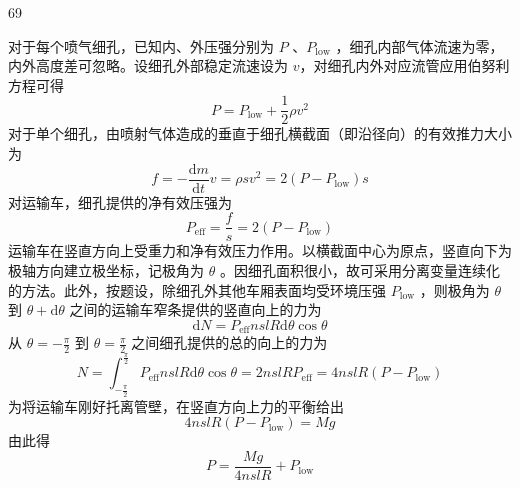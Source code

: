 \begin{solution}{69}
    \begin{subsolution}
        对于每个喷气细孔，已知内、外压强分别为 $P$ 、$P_{\mathrm{low}}$ ，细孔内部气体流速为零，内外高度差可忽略。设细孔外部稳定流速设为 $v$，对细孔内外对应流管应用伯努利方程可得
        \begin{equation}
            P = P_{\mathrm{low}} + \frac{1}{2}\rho v^{2} \label{eq:1.p69}
        \end{equation}
        对于单个细孔，由喷射气体造成的垂直于细孔横截面（即沿径向）的有效推力大小为
        \begin{equation}
            f = -\frac{\mathrm{d}m}{\mathrm{d}t} v = \rho s v^{2} = 2(P - P_{\mathrm{low}}) s \label{eq:2.p69}
        \end{equation}
        对运输车，细孔提供的净有效压强为
        \begin{equation*}
            P_{\mathrm{eff}} = \frac{f}{s} = 2(P - P_{\mathrm{low}})
        \end{equation*}
        运输车在竖直方向上受重力和净有效压力作用。以横截面中心为原点，竖直向下为极轴方向建立极坐标，记极角为 $\theta$ 。因细孔面积很小，故可采用分离变量连续化的方法。此外，按题设，除细孔外其他车厢表面均受环境压强 $P_{\mathrm{low}}$ ，则极角为 $\theta$ 到 $\theta + \mathrm{d}\theta$ 之间的运输车窄条提供的竖直向上的力为
        \begin{equation*}
            \mathrm{d}N = P_{\mathrm{eff}} n s l R \mathrm{d}\theta \cos\theta
        \end{equation*}
        从 $\theta = -\frac{\pi}{2}$ 到 $\theta = \frac{\pi}{2}$ 之间细孔提供的总的向上的力为
        \begin{equation}
            N = \int_{-\frac{\pi}{2}}^{\frac{\pi}{2}} P_{\mathrm{eff}} n s l R \mathrm{d}\theta \cos\theta = 2 n s l R P_{\mathrm{eff}} = 4 n s l R (P - P_{\mathrm{low}}) \label{eq:3.p69}
        \end{equation}
        为将运输车刚好托离管壁，在竖直方向上力的平衡给出
        \begin{equation}
            4 n s l R (P - P_{\mathrm{low}}) = M g \label{eq:4.p69}
        \end{equation}
        由此得
        \begin{equation}
            P = \frac{M g}{4 n s l R} + P_{\mathrm{low}} \label{eq:5.p69}
        \end{equation}
    \end{subsolution}
    \begin{subsolution}

\end{subsolution}
\end{solution}
